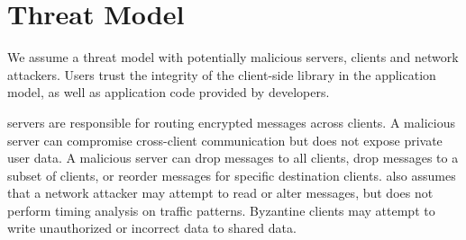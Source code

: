\section{Threat Model}


We assume a threat model with potentially malicious servers, clients and network attackers. Users trust the integrity of the client-side library in the application model, as well as application code provided by developers. 

\name{} servers are responsible for routing encrypted messages across clients. A malicious server can compromise cross-client communication but does not expose private user data. A malicious server can drop messages to all clients, drop messages to a subset of clients, or reorder messages for specific destination clients. 
\name{} also assumes that a network attacker may attempt to read or alter messages, but does not perform timing analysis on traffic patterns. Byzantine clients may attempt to write unauthorized or incorrect data to shared data.


